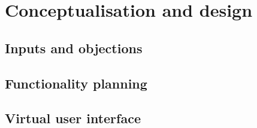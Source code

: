 \section{Conceptualisation and design}

\subsection{Inputs and objections}

\subsection{Functionality planning}

\subsection{Virtual user interface}

